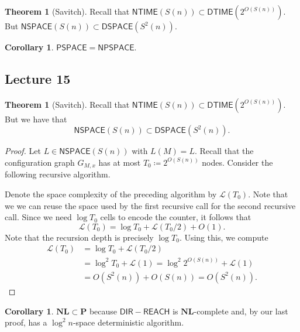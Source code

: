 \documentclass[10pt,letterpaper,cm]{nupset}
\theoremstyle{definition}
\theoremstyle{theorem}
\newtheorem{theorem}[definition]{Theorem}
\newtheorem{corollary}[definition]{Corollary}
\theoremstyle{remark}
\newcommand{\1}{\mathbf{1}}
\newcommand{\0}{\vec 0}
\begin{document}
\begin{theorem}[Savitch]
Recall that $\mathsf{NTIME}(S(n)) \subset \mathsf{DTIME}(2^{O(S(n))})$. But $\mathsf{NSPACE}(S(n)) \subset \mathsf{DSPACE}(S^2(n))$.
\end{theorem}

\begin{corollary}
$\mathsf{PSPACE} = \mathsf{NPSPACE}$.
\end{corollary}

\subsection{Lecture 15}

\begin{theorem}[Savitch]
Recall that $\mathsf{NTIME}(S(n)) \subset \mathsf{DTIME}(2^{O(S(n))})$. But we have that $$\mathsf{NSPACE}(S(n)) \subset \mathsf{DSPACE}(S^2(n)).$$
\end{theorem}
\begin{proof}
Let $L \in \mathsf{NSPACE}(S(n)) $ with $L(M) = L$. Recall that the configuration graph $G_{M,x}$ has at most $T_0\coloneqq 2^{O(S(n))}$ nodes. Consider the following recursive algorithm.

\begin{algorithm}[H]
   {}
\end{algorithm}


Denote the space complexity of the preceding algorithm by $\mathcal{L}(T_0)$. Note that we we can reuse the space used by the first recursive call for the second recursive call. Since we need $\log{T_0}$ cells to encode the counter, it follows that
$$  \mathcal{L}(T_0) = \log{T_0} + \mathcal{L}(T_0/2) + O(1) .   $$   Note that the recursion depth is precisely $\log{T_0}$. Using this, we compute
\begin{align*}  \mathcal{L}(T_0)  & =    \log{T_0} + \mathcal{L}(T_0/2) 
\\ & = \log^2{T_0} + \mathcal{L}(1) =  \log^2{2^{O(S(n))}} + \mathcal{L}(1) 
\\ & = O(S^2(n)) + O(S(n)) = O(S^2(n))  .
\end{align*}
\end{proof}

\begin{corollary}
$\mathbf{NL} \subset \mathbf{P}$ because $\mathsf{DIR{-}REACH}$ is  $\mathbf{NL}$-complete and, by our last proof, has a $\log^2{n}$-space deterministic algorithm.
\end{corollary}
\end{document}
